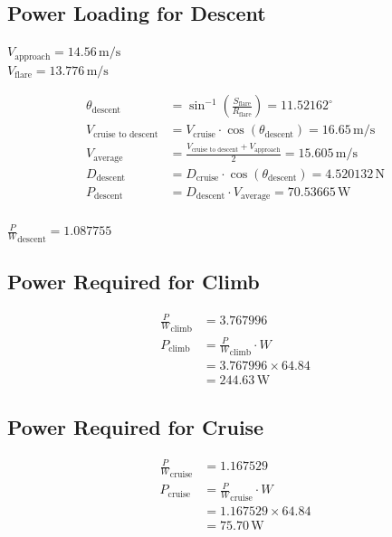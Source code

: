 \documentclass[12 pt]{article}
\begin{document}
\subsection {Power Loading for Descent}

\begin{center}
$V_{\text{approach}} = 14.56 \, \text{m/s}$ \\
$V_{\text{flare}} = 13.776 \, \text{m/s}$
\end{center}
\begin{align*}
\theta_{\text{descent}} &= \sin^{-1}\left(\frac{S_{\text{flare}}}{R_{\text{flare}}}\right) = 11.52162^\circ \\
V_{\text{cruise to descent}} &= V_{\text{cruise}} \cdot \cos(\theta_{\text{descent}}) = 16.65 \, \text{m/s} \\
V_{\text{average}} &= \frac{V_{\text{cruise to descent}} + V_{\text{approach}}}{2} = 15.605 \, \text{m/s} \\
D_{\text{descent}} &= D_{\text{cruise}} \cdot \cos(\theta_{\text{descent}}) = 4.520132 \, \text{N} \\
P_{\text{descent}} &= D_{\text{descent}} \cdot V_{\text{average}} = 70.53665 \, \text{W} \\
\end{align*}
\begin{center}
$\frac{P}{W}_{\text{descent}} = 1.087755$
\end{center}
\subsection {Power Required for Climb}

\begin{align*}
\frac{P}{W}_{\text{climb}} &= 3.767996 \\
P_{\text{climb}} &= \frac{P}{W}_{\text{climb}} \cdot W \\
&= 3.767996 \times 64.84 \\
&= 244.63 \, \text{W}
\end{align*}

\subsection {Power Required for Cruise}

\begin{align*}
\frac{P}{W}_{\text{cruise}} &= 1.167529 \\
P_{\text{cruise}} &= \frac{P}{W}_{\text{cruise}} \cdot W \\
&= 1.167529 \times 64.84 \\
&= 75.70 \, \text{W}
\end{align*}
\end{document}
